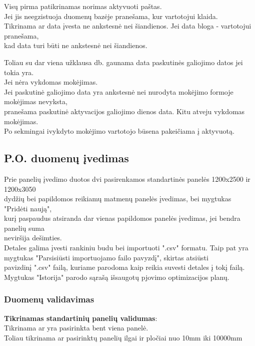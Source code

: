 \documentclass[a4paper,12pt]{article}
\begin{document}
Visų pirma patikrinamas norimas aktyvuoti paštas. \\
Jei jis neegzistuoja duomenų bazėje pranešama, kur vartotojui klaida.\\

Tikrinama ar data įvesta ne ankstesnė nei šiandienos. Jei data bloga - vartotojui pranešama, \\
kad data turi būti ne ankstesnė nei šiandienos.

Toliau su dar viena užklausa db. gaunama data paskutinės galiojimo datos jei tokia yra. \\
Jei nėra vykdomas mokėjimas. \\
Jei paskutinė galiojimo data yra ankstesnė nei nurodyta mokėjimo formoje mokėjimas nevyksta, \\
pranešama paskutinė aktyvacijos galiojimo dienos data. Kitu atveju vykdomas mokėjimas. \\

Po sekmingai ivykdyto mokėjimo vartotojo būsena pakeičiama į aktyvuotą.
 
	
	
\subsection{ P.O. duomenų įvedimas }

Prie panelių įvedimo duotos dvi pasirenkamos standartinės panelės 1200x2500 ir 1200x3050\\ 
dydžių bei papildomos reikiamų matmenų panelės įvedimas, bei mygtukas "Pridėti naują", \\
kurį paspaudus atsiranda dar vienas papildomos panelės įvedimas, jei bendra panelių suma \\
neviršija dešimties. \\
Detales galima įvesti rankiniu budu bei importuoti ".csv" formatu. 
Taip pat yra mygtukas "Parsisiūsti importuojamo failo pavyzdį", skirtas atsiūsti \\
pavizdinį ".csv" failą, kuriame parodoma kaip reikia suvesti detales į tokį failą. \\
Mygtukas "Istorija" parodo sąrašą išsaugotų pjovimo optimizacijos planų.

\subsubsection{Duomenų validavimas}
\textbf{Tikrinamas standartinių panelių validumas}:\\
	Tikrinama ar yra pasirinkta bent viena panelė. \\
	Toliau tikrinama ar pasirinktų panelių ilgai ir pločiai nuo 10mm iki 10000mm \\
\end{document}
